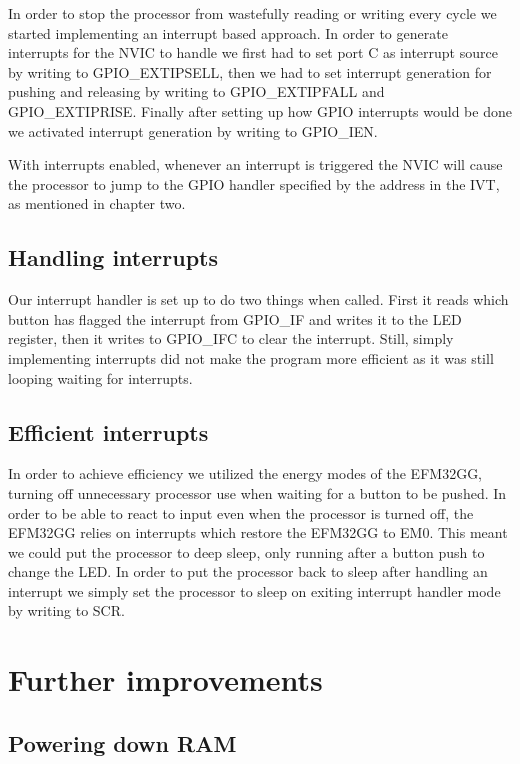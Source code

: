 In order to stop the processor from wastefully reading or writing every cycle we started implementing an interrupt based approach. In order to generate interrupts for the NVIC to handle we first had to set port C as interrupt source by writing to GPIO\_EXTIPSELL, then we had to set interrupt generation for pushing and releasing by writing to GPIO\_EXTIPFALL and GPIO\_EXTIPRISE. Finally after setting up how GPIO interrupts would be done we activated interrupt generation by writing to GPIO\_IEN.

With interrupts enabled, whenever an interrupt is triggered the NVIC will cause the processor to jump to the GPIO handler specified by the address in the IVT, as mentioned in chapter two.

\subsection{Handling interrupts}

Our interrupt handler is set up to do two things when called. First it reads which button has flagged the interrupt from GPIO\_IF and writes it to the LED register, then it writes to GPIO\_IFC to clear the interrupt. Still, simply implementing interrupts did not make the program more efficient as it was still looping waiting for interrupts.

\subsection{Efficient interrupts}

In order to achieve efficiency we utilized the energy modes of the EFM32GG, turning off unnecessary processor use when waiting for a button to be pushed. In order to be able to react to input even when the processor is turned off, the EFM32GG relies on interrupts which restore the EFM32GG to EM0. This meant we could put the processor to deep sleep, only running after a button push to change the LED. In order to put the processor back to sleep after handling an interrupt we simply set the processor to sleep on exiting interrupt handler mode by writing to SCR.


\section{Further improvements}

\subsection{Powering down RAM}

